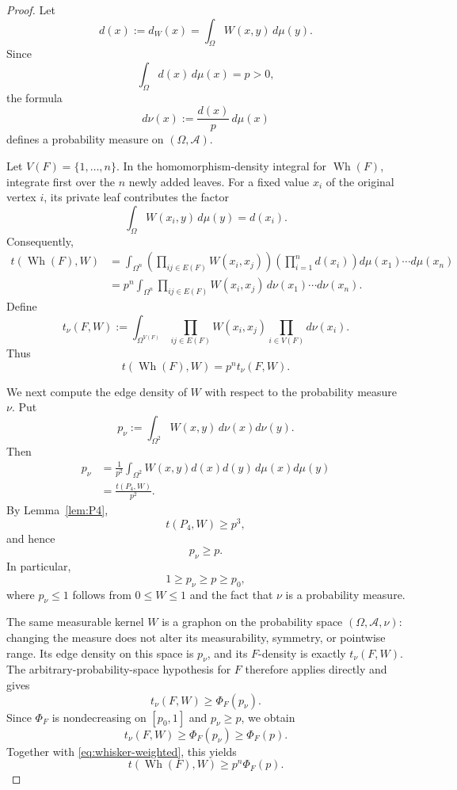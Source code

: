 \documentclass[11pt]{article}
\begin{document}
\begin{proof}
Let
\[
    d(x):=d_W(x)=\int_\Omega W(x,y)\,d\mu(y).
\]
Since
\[
    \int_\Omega d(x)\,d\mu(x)=p>0,
\]
the formula
\[
    d\nu(x):=\frac{d(x)}{p}\,d\mu(x)
\]
defines a probability measure on $(\Omega,\mathcal A)$.

Let $V(F)=\{1,\dots,n\}$. In the homomorphism-density integral for
$\operatorname{Wh}(F)$, integrate first over the $n$ newly added leaves.
For a fixed value $x_i$ of the original vertex $i$, its private leaf
contributes the factor
\[
    \int_\Omega W(x_i,y)\,d\mu(y)=d(x_i).
\]
Consequently,
\[
\begin{aligned}
    t(\operatorname{Wh}(F),W)
    &=
    \int_{\Omega^n}
       \left(
         \prod_{ij\in E(F)}W(x_i,x_j)
       \right)
       \left(
         \prod_{i=1}^n d(x_i)
       \right)
       d\mu(x_1)\cdots d\mu(x_n)
    \\
    &=
    p^n
    \int_{\Omega^n}
       \prod_{ij\in E(F)}W(x_i,x_j)
       \,d\nu(x_1)\cdots d\nu(x_n).
\end{aligned}
\]
Define
\[
    t_\nu(F,W)
    :=
    \int_{\Omega^{V(F)}}
       \prod_{ij\in E(F)}W(x_i,x_j)
       \prod_{i\in V(F)}d\nu(x_i).
\]
Thus
\begin{equation}\label{eq:whisker-weighted}
    t(\operatorname{Wh}(F),W)
    =
    p^n t_\nu(F,W).
\end{equation}

We next compute the edge density of $W$ with respect to the
probability measure $\nu$. Put
\[
    p_\nu
    :=
    \int_{\Omega^2}W(x,y)\,d\nu(x)d\nu(y).
\]
Then
\[
\begin{aligned}
    p_\nu
    &=
    \frac{1}{p^2}
    \int_{\Omega^2}
       W(x,y)d(x)d(y)\,d\mu(x)d\mu(y)
    \\
    &=
    \frac{t(P_4,W)}{p^2}.
\end{aligned}
\]
By Lemma~\ref{lem:P4},
\[
    t(P_4,W)\ge p^3,
\]
and hence
\begin{equation}\label{eq:pnu-ge-p}
    p_\nu\ge p.
\end{equation}
In particular,
\[
    1\ge p_\nu\ge p\ge p_0,
\]
where $p_\nu\le1$ follows from $0\le W\le1$ and the fact that $\nu$
is a probability measure.

The same measurable kernel $W$ is a graphon on the probability space
$(\Omega,\mathcal A,\nu)$: changing the measure does not alter its
measurability, symmetry, or pointwise range.  Its edge density on this
space is $p_\nu$, and its $F$-density is exactly $t_\nu(F,W)$.
The arbitrary-probability-space hypothesis for $F$ therefore applies
directly and gives
\[
    t_\nu(F,W)
    \ge
    \Phi_F(p_\nu).
\]
Since $\Phi_F$ is nondecreasing on $[p_0,1]$ and
$p_\nu\ge p$, we obtain
\[
    t_\nu(F,W)
    \ge
    \Phi_F(p_\nu)
    \ge
    \Phi_F(p).
\]
Together with \eqref{eq:whisker-weighted}, this yields
\begin{equation}\label{eq:whisker-main}
    t(\operatorname{Wh}(F),W)
    \ge
    p^n\Phi_F(p).
\end{equation}


\end{proof}
\end{document}
